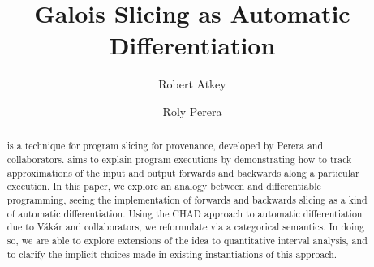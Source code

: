 \documentclass[acmsmall,screen,anonymous,review]{acmart}
\begin{document}
\title{Galois Slicing as Automatic Differentiation}

\author{Robert Atkey}

\author{Roly Perera}

\begin{abstract}
  \GPS is a technique for program slicing for provenance, developed by
  Perera and collaborators. \GPS aims to explain program executions by
  demonstrating how to track approximations of the input and output
  forwards and backwards along a particular execution. In this paper,
  we explore an analogy between \GPS and differentiable programming,
  seeing the implementation of forwards and backwards slicing as a kind of automatic
  differentiation. Using the CHAD approach to automatic differentiation
  due to V{\'a}k{\'a}r and collaborators, we reformulate \GPS via a
  categorical semantics. In doing so, we are able to explore
  extensions of the \GPS idea to quantitative interval analysis, and
  to clarify the implicit choices made in existing instantiations of this approach.
\end{abstract}
\maketitle












% 
\end{document}
